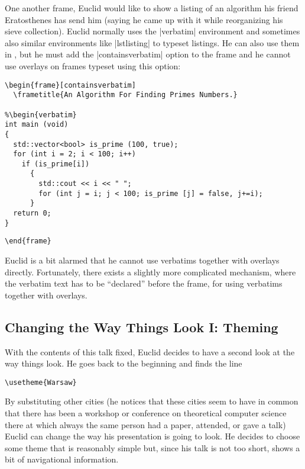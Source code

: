 One another frame, Euclid would like to show a listing of an
algorithm his friend Eratosthenes has send him (saying he came up with
it while reorganizing his sieve collection). Euclid normally uses the
|verbatim| environment and sometimes also similar environments like
|lstlisting| to typeset listings. He can also use them in \beamer, but
he must add the |containsverbatim| option to the frame and he cannot
use overlays on frames typeset using this option:
\begin{verbatim}
\begin{frame}[containsverbatim]
  \frametitle{An Algorithm For Finding Primes Numbers.}

%\begin{verbatim} 
int main (void)
{
  std::vector<bool> is_prime (100, true);
  for (int i = 2; i < 100; i++)
    if (is_prime[i])
      {
        std::cout << i << " ";
        for (int j = i; j < 100; is_prime [j] = false, j+=i);
      }
  return 0;
} 
\end{verbatim}
\unskip{\MacroFont|\end{verbatim}|}
\begin{verbatim}
\end{frame}
\end{verbatim}
Euclid is a bit alarmed that he cannot use verbatims together with
overlays directly. Fortunately, there exists a slightly more
complicated mechanism, where the verbatim text has to be ``declared''
before the frame, for using verbatims together with overlays.



\subsection{Changing the Way Things Look I: Theming}

With the contents of this talk fixed, Euclid decides to have a second
look at the way things look. He goes back to the beginning and finds
the line
\begin{verbatim}
\usetheme{Warsaw}
\end{verbatim}
By substituting other cities (he notices that these cities seem to
have in common that there has been a workshop or conference on
theoretical computer science there at which always the same person had
a paper, attended, or gave a talk) Euclid can change the way his
presentation is going to look. He decides to choose some theme that is
reasonably simple but, since his talk is not too short, shows a bit of
navigational information.

